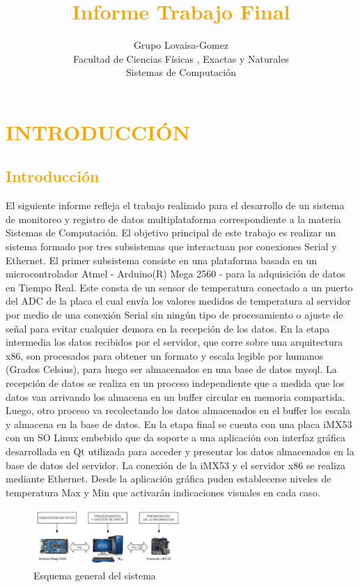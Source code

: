 \documentclass[a4paper,11pt]{book}
\title{\textcolor{orange}{Informe Trabajo Final}}
\author{Grupo Lovaisa-Gomez \\ Facultad de Ciencias Físicas , Exactas y
Naturales\\ Sistemas de Computación}
\begin{document}

\maketitle
\tableofcontents


\chapter{\textcolor{orange}{INTRODUCCIÓN}}

\newpage
\section{\textcolor{orange}{Introducción}}
El siguiente informe refleja el trabajo realizado para el desarrollo de un
sistema de monitoreo y registro de datos multiplataforma correspondiente a la
materia Sistemas de Computación. El objetivo principal de este trabajo es
realizar un sistema formado por tres subsistemas que interactuan por
conexiones Serial y Ethernet. El primer subsistema consiste en una plataforma
basada en un microcontrolador Atmel - Arduino(R) Mega 2560 - para la
adquisición de datos en Tiempo Real. Este consta de un sensor de temperatura
conectado a un puerto del ADC de la placa el cual envía los valores medidos de
temperatura al servidor por medio de una conexión Serial sin ningún tipo de
procesamiento o ajuste de señal para evitar cualquier demora en la recepción de
los datos. 
En la etapa intermedia los datos recibidos por el servidor, que
corre sobre una arquitectura x86, son procesados para obtener un formato y
escala legible por humanos (Grados Celsius), para luego ser almacenados en una
base de datos mysql. La recepción de datos se realiza en un proceso
independiente que a medida que los datos van arrivando los almacena en un buffer
circular en memoria compartida. Luego, otro proceso va recolectando los datos
almacenados en el buffer los escala y almacena en la base de datos.
En la etapa final se cuenta con una placa iMX53 con un SO Linux embebido que da
soporte a una aplicación con interfaz gráfica desarrollada en Qt utilizada para
acceder y presentar los datos almacenados en la base de datos del servidor. La
conexión de la iMX53 y el servidor x86 se realiza mediante Ethernet. Desde la
aplicación gráfica puden establecerse niveles de temperatura Max y Min que
activarán indicaciones visuales en cada caso.   
\begin{figure}[h!]
 \begin{center}
  \includegraphics[width=0.5\textwidth,keepaspectratio=true]{img/fig1.png}
  \caption{Esquema general del sistema}
  \label{fig:esquema}
 \end{center}
\end{figure}
\end{document}
